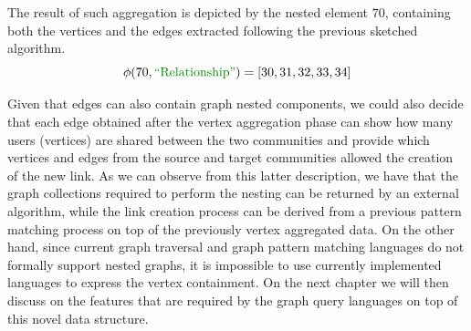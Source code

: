 \begin{example}
The result of such aggregation is depicted by the nested element $70$, containing both the vertices and the edges extracted following the previous sketched algorithm.
\[\phi(70,\RELA)=[30,31,32,33,34]\]
\end{example}


Given that edges can also contain graph nested components, we could also decide that each edge obtained after the vertex aggregation phase can show how many users (vertices) are shared between the two communities and provide which vertices and edges from the source and target communities allowed the creation of the new link. As we can observe from this latter description, we have that the graph collections required to perform the nesting can be returned by an external algorithm, while the link creation process can be derived from a previous pattern matching process on top of the previously vertex aggregated data. On the other hand, since current graph traversal and graph pattern matching languages do not formally support nested graphs, it is impossible to use currently implemented languages to express the vertex containment. On the next chapter we will then discuss on the features that are required by the graph query languages on top of this novel data structure.


